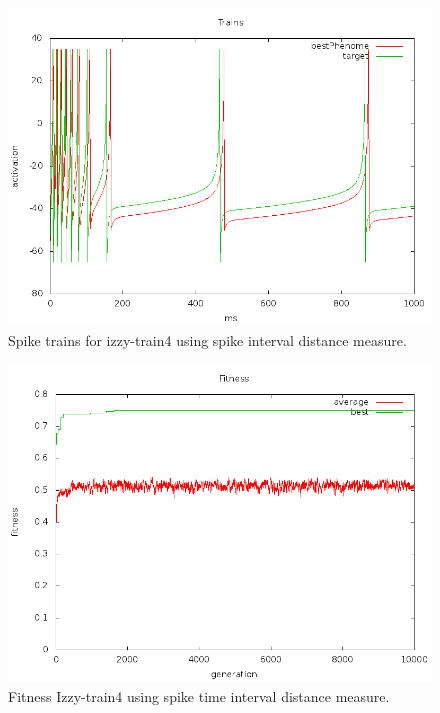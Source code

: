 \documentclass[a4paper]{article}
\begin{document}
\begin{figure}[htb!]
  \centering
  \includegraphics[width=\textwidth]{SpikeInterval-izzy4-trains-plot.png}
  \caption{Spike trains for izzy-train4 using spike interval distance measure.}
\end{figure}

\newpage

\begin{figure}[htb!]
  \centering
  \includegraphics[width=\textwidth]{Waveform-izzy4-fitness-plot.png}
  \caption{Fitness Izzy-train4 using spike time interval distance measure.}
\end{figure}
\end{document}
